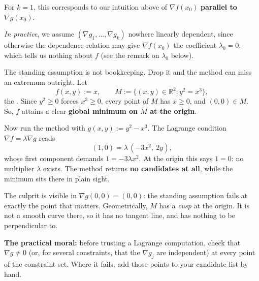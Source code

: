 For $k = 1$, this corresponds to our intuition above of $\nabla f(x_0)$ \textbf{parallel to}
$\nabla g(x_0)$.

\textit{In practice}, we assume $(\nabla g_1, \dots, \nabla g_k)$ nowhere linearly dependent,
since otherwise the dependence relation may give $\nabla f(x_0)$ the coefficient $\lambda_0 = 0$,
which tells us nothing about $f$ (see the remark on $\lambda_0$ below).

\begin{aiexample}
\label{ex:constraint_qualification_fails}
The standing assumption is not bookkeeping. Drop it and the method can miss an extremum
outright. Let
\[f(x,y) := x, \qquad M := \{(x,y) \in \mathbb{R}^2 : y^2 = x^3\},\]
the  . Since $y^2 \geq 0$ forces
$x^3 \geq 0$, every point of $M$ has $x \geq 0$, and $(0,0) \in M$. So, $f$ attains a clear
\textbf{global minimum on $M$ at the origin}.

Now run the method with $g(x,y) := y^2-x^3$. The Lagrange condition $\nabla f = \lambda\nabla g$
reads
\[(1,0) = \lambda\,(-3x^2,\ 2y),\]
whose first component demands $1 = -3\lambda x^2$. At the origin this says $1 = 0$: no
multiplier $\lambda$ exists. The method returns \textbf{no candidates at all}, while the minimum
sits there in plain sight.

The culprit is visible in $\nabla g(0,0) = (0,0)$: the standing assumption fails at exactly the
point that matters. Geometrically, $M$ has a \emph{cusp} at the origin. It is not a smooth curve
there, so it has no tangent line, and  has nothing
to be perpendicular to.

\textbf{The practical moral:} before trusting a Lagrange computation, check that
$\nabla g \neq 0$ (or, for several constraints, that the $\nabla g_j$ are independent) at every
point of the constraint set. Where it fails, add those points to your candidate list by hand.
\end{aiexample}

